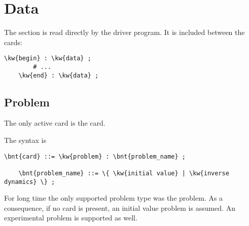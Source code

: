 %
%
%
%
%
% 
%
%

\chapter{Data}\label{sec:DATA}
The  section is read directly by the driver program. It is
included between the cards:
\begin{Verbatim}[commandchars=\\\{\}]
    \kw{begin} : \kw{data} ;
        # ...
    \kw{end} : \kw{data} ;
\end{Verbatim}

\section{Problem}
The only active card is the  card.

The syntax is
\begin{Verbatim}[commandchars=\\\{\}]
    \bnt{card} ::= \kw{problem} : \bnt{problem_name} ;

    \bnt{problem_name} ::= \{ \kw{initial value} | \kw{inverse dynamics} \} ;
\end{Verbatim}
For long time the only supported problem type was the
 problem.
As a consequence, if no  card is present,
an initial value problem is assumed.
An experimental  problem is supported as well.

